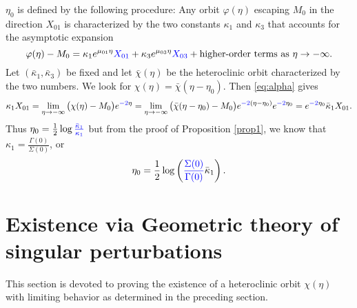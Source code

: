 \documentclass[a4paper,11pt]{article}
\def\blue{\color{blue}}
\theoremstyle{remark}
\begin{document}
$\eta_0$ is defined by the following procedure:  Any orbit $\varphi(\eta)$ escaping $M_0$ in the direction $X_{01}$ is {\blue characterized by the two constants $\kappa_1$ and $\kappa_3$ that accounts for the asymptotic expansion} %
 \begin{equation}\label{eq:alpha-expan}
  \varphi(\eta) - M_0 = \kappa_1 e^{\mu_{01}\eta} {\blue X_{01}} + \kappa_3 e^{\mu_{03}\eta}{\blue X_{03}} + \text{higher-order terms as $\eta \rightarrow -\infty$}.
 \end{equation}
Let $(\bar\kappa_1,\bar\kappa_3)$ be fixed and let $\bar\chi(\eta)$ be the heteroclinic orbit characterized by {\blue the two numbers}. We look for $\chi(\eta) = \bar\chi(\eta-\eta_0)$. Then \eqref{eq:alpha} gives
$$\kappa_1 X_{01}=\lim_{\eta \rightarrow -\infty}\big(\chi(\eta) - M_0\big)e^{{\blue -2}\eta} = \lim_{\eta \rightarrow -\infty} \big(\bar\chi(\eta-\eta_0) - M_0\big)e^{{\blue -2}(\eta-\eta_0)}e^{{\blue -2}\eta_0} = e^{{\blue -2}\eta_0}\bar\kappa_1 X_{01}.$$
Thus $\eta_0 = \frac{1}{2}\log {{\blue \frac{\bar\kappa_1}{\kappa_1}}}$ but from the proof of Proposition \ref{prop1}, we know that
$\kappa_1 = \frac{\Gamma(0)}{\Sigma(0)}$, or
\begin{equation}
 \eta_0 = \frac{1}{2}\log \left({\blue \frac{\Sigma(0)}{\Gamma(0)}}\bar\kappa_1\right).%
\end{equation}

\vfil\eject

\section{Existence via Geometric theory of singular perturbations} \label{sec:proof}
This section is devoted to proving the existence of a heteroclinic orbit $\chi(\eta)$ with limiting behavior as determined in the preceding section.
\end{document}
